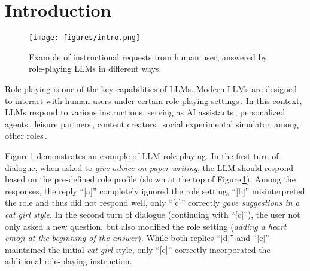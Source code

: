 \section{Introduction}
\label{sec:intro}

\begin{figure}[t]
    \centering
    \texttt{[image: figures/intro.png]}
    \vspace{-6mm}
    \caption{Example of  instructional requests from human user, answered by role-playing LLMs in different ways.}
    \label{fig:intro}
    \vspace{-6mm}
\end{figure}

Role-playing is one of the key capabilities of LLMs. %
Modern LLMs are designed to interact with human users under certain role-playing settings\,\cite{chen2024persona,tseng-etal-2024-two}. In this context, LLMs respond to various instructions, serving as AI assistants\,\cite{openai2023gpt4, ji-etal-2022-achieving}, personalized agents\,\cite{zhong2022less,lu2023memochat,lei-etal-2022-assistsr}, leisure partners\,\cite{li2023chatharuhi,agrawal-etal-2023-multimodal}, content creators\,\cite{narrativeplay_aaai,chen2024hollmwood,narrativeplay_eacl}, social experimental simulator\,\cite{park2023generative,xu2024character} among other roles\,\cite{tian2023chatplug}. 

Figure\,\ref{fig:intro} demonstrates an example of LLM role-playing. In the first turn of dialogue, when asked to \emph{give advice on paper writing}, the LLM should respond based on the pre-defined role profile (shown at the top of Figure\,\ref{fig:intro}). Among the responses, the reply ``[a]'' completely ignored the role setting, ``[b]'' misinterpreted the role and thus did not respond well, only ``[c]'' correctly \emph{gave suggestions in a \emph{cat girl} style}. In the second turn of dialogue (continuing with ``[c]''), the user not only asked a new question, but also modified the role setting (\emph{adding a heart emoji at the beginning of the answer}). While both replies ``[d]'' and ``[e]'' maintained the initial \emph{cat girl} style, only ``[e]'' correctly incorporated the additional role-playing instruction.

